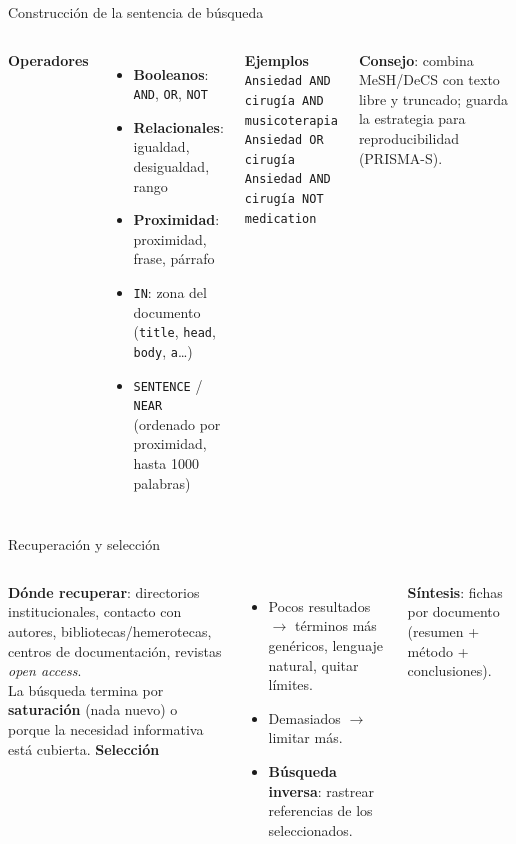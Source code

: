 \documentclass[aspectratio=169,8pt]{beamer}
\begin{document}
\begin{frame}{Construcci\'on de la sentencia de b\'usqueda}
  \small
  \begin{columns}[T,onlytextwidth]
      \textbf{Operadores}
      \begin{itemize}
        \item \textbf{Booleanos}: \texttt{AND}, \texttt{OR}, \texttt{NOT}
        \item \textbf{Relacionales}: igualdad, desigualdad, rango
        \item \textbf{Proximidad}: proximidad, frase, p\'arrafo
        \item \texttt{IN}: zona del documento (\texttt{title}, \texttt{head}, \texttt{body}, \texttt{a}\ldots)
        \item \texttt{SENTENCE} / \texttt{NEAR} (ordenado por proximidad, hasta 1000 palabras)
      \end{itemize}
      \begin{tcolorbox}[amberbox]
        \footnotesize\textbf{Ejemplos}\\
        \texttt{Ansiedad AND cirug\'ia AND musicoterapia}\\
        \texttt{Ansiedad OR cirug\'ia}\\
        \texttt{Ansiedad AND cirug\'ia NOT medication}
      \end{tcolorbox}
      \begin{tcolorbox}[infobox]
        \scriptsize\textbf{Consejo}: combina MeSH/DeCS con texto libre y truncado; guarda la estrategia para reproducibilidad (PRISMA-S).
      \end{tcolorbox}
    \end{columns}
\end{frame}

\begin{frame}{Recuperaci\'on y selecci\'on}
  \small
  \begin{columns}[T,onlytextwidth]
      \textbf{D\'onde recuperar}: directorios institucionales, contacto con autores, bibliotecas/hemerotecas, centros de documentaci\'on, revistas \emph{open access}.\\[4pt]
      La b\'usqueda termina por \textbf{saturaci\'on} (nada nuevo) o porque la necesidad informativa est\'a cubierta.
      \textbf{Selecci\'on}
      \begin{itemize}
        \item Pocos resultados $\to$ t\'erminos m\'as gen\'ericos, lenguaje natural, quitar l\'imites.
        \item Demasiados $\to$ limitar m\'as.
        \item \textbf{B\'usqueda inversa}: rastrear referencias de los seleccionados.
      \end{itemize}
      \textbf{S\'intesis}: fichas por documento (resumen + m\'etodo + conclusiones).
    \end{columns}
\end{frame}
\end{document}
